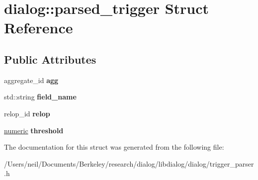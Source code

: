 \hypertarget{structdialog_1_1parsed__trigger}{}\section{dialog\+:\+:parsed\+\_\+trigger Struct Reference}
\label{structdialog_1_1parsed__trigger}
\subsection*{Public Attributes}
\begin{DoxyCompactItemize}
\item 
\mbox{\label{structdialog_1_1parsed__trigger_a5763d9244b7d6f01249ee32b1eb8cfc8}} 
aggregate\+\_\+id {\bfseries agg}
\item 
\mbox{\label{structdialog_1_1parsed__trigger_ab02305f279f325fe60cf0551314c33a3}} 
std\+::string {\bfseries field\+\_\+name}
\item 
\mbox{\label{structdialog_1_1parsed__trigger_acee20afdadf32c97c28d49d1f6116ce8}} 
relop\+\_\+id {\bfseries relop}
\item 
\mbox{\label{structdialog_1_1parsed__trigger_acebec1763692d13a6c83ab7c8271b6b7}} 
\hyperlink{classdialog_1_1numeric}{numeric} {\bfseries threshold}
\end{DoxyCompactItemize}


The documentation for this struct was generated from the following file\+:\begin{DoxyCompactItemize}
\item 
/\+Users/neil/\+Documents/\+Berkeley/research/dialog/libdialog/dialog/trigger\+\_\+parser.\+h\end{DoxyCompactItemize}
